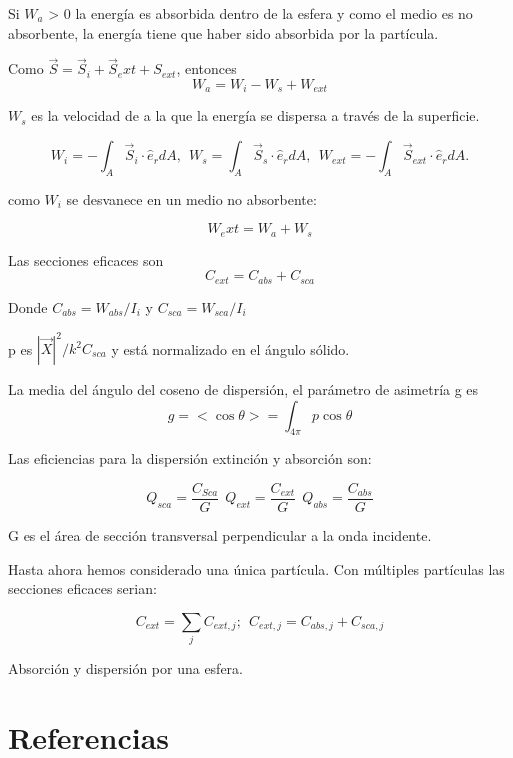 \documentclass{article}
\begin{document}
Si $W_a$ > 0 la energía es absorbida dentro de la esfera y como el medio es no absorbente, la energía tiene que haber sido absorbida por la partícula.

Como $\vec S = \vec S_i + \vec S_ext + S_{ext}$, entonces
\begin{equation}
    W_a = W_i -W_s + W_{ext}
\end{equation}

$W_s$ es la velocidad de a la que la energía se dispersa a través de la superficie.

\begin{equation}
    W_i = -\int_A \vec S_i \cdot \hat{e}_rdA, \ \
    W_s = \int_A \vec S_s \cdot \hat{e}_rdA, \ \
    W_{ext}= -\int_A \vec S_{ext} \cdot \hat{e}_rdA.
\end{equation}

como $W_i$ se desvanece en un medio no absorbente:

\begin{equation}
    W_ext = W_a + W_s
\end{equation}

Las secciones eficaces son 
\begin{equation}
    C_{ext} = C_{abs} + C_{sca}
\end{equation}

Donde $C_{abs}=W_{abs}/I_i$ y $C_{sca}=W_{sca}/I_i$ 


p es $|\vec X|^2/k^2C_{sca}$ y está normalizado en el ángulo sólido.

La media del ángulo del coseno de dispersión, el parámetro de asimetría g es
\begin{equation}
    g = <\cos\theta> = \int_{4\pi} p\cos \theta
\end{equation}

Las eficiencias para la dispersión extinción y absorción son:

\begin{equation}
    Q_{sca} = \frac{C_{Sca}}{G} \ \ Q_{ext} = \frac{C_{ext}}{G} \ \ Q_{abs} = \frac{C_{abs}}{G}
\end{equation}

G es el área de sección transversal perpendicular a la onda incidente.

Hasta ahora hemos considerado una única partícula. Con múltiples partículas las secciones eficaces serian:

\begin{equation}
    C_{ext} = \sum_j C_{ext, j}; \ \ C_{ext, j} = C_{abs,j} + C_{sca, j}
\end{equation}


Absorción y dispersión por una esfera.

\section{Referencias}


\end{document}
